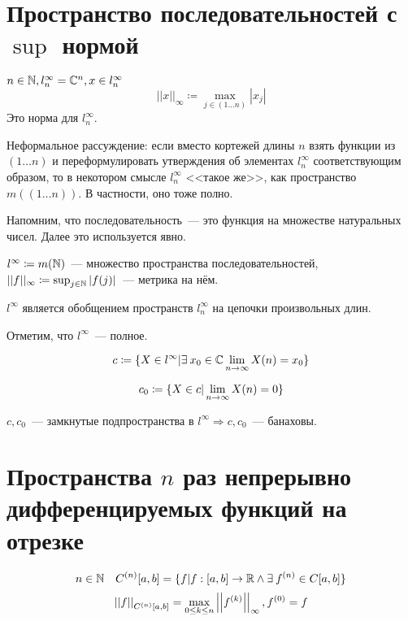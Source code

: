 \documentclass[document]{subfiles}
\begin{document}
\section{Пространство последовательностей с $\sup$ нормой}

\begin{definition}
    $n \in \mathbb{N}, l^\infty_n = \mathbb{C}^n, x \in l^\infty_n$
    \[ ||x||_\infty \coloneqq \max_{j \in (1\ldots n)} |x_j| \]
    Это норма для $l^\infty_n$.
\end{definition}

Неформальное рассуждение: если вместо кортежей длины $n$ взять функции из $(1\ldots n)$ и переформулировать утверждения об элементах $l^\infty_n$ соответствующим образом, то в некотором смысле $l^\infty_n$ <<такое же>>, как пространство $m((1\ldots n))$. В частности, оно тоже полно.

Напомним, что последовательность~--- это функция на множестве натуральных чисел. Далее это используется явно.

\begin{definition}[$l^\infty$]
    $l^\infty \coloneqq m(\mathbb{N})$~--- множество пространства последовательностей, $||f||_\infty \coloneqq \sup_{j \in \mathbb{N}} |f(j)|$~--- метрика на нём.
\end{definition}

$l^\infty$ является обобщением пространств $l^\infty_n$ на цепочки произвольных длин.

Отметим, что $l^\infty$~--- полное.

\begin{definition}
    \[ c \coloneqq \{ X \in l^\infty | \exists x_0 \in \bC  \liml_{n \to \infty}{X(n)} = x_0 \} \]
\end{definition}
\begin{definition}
    \[ c_0 \coloneqq \{X \in c | \lim\limits_{n \to \infty} X(n) = 0\} \]
\end{definition}

$c, c_0$~--- замкнутые подпространства в $l^\infty \Rightarrow c, c_0$~--- банаховы. 

\section{Пространства $n$ раз непрерывно дифференцируемых функций на отрезке}

 \begin{definition}
    \[n \in \bN \quad C^{(n)}[a,b] = \{ f | f: [a, b] \rightarrow \bR \land \exists f^{(n)} \in C[a,b] \} \]
    \[ \left|\left| {f} \right| \right|_{C^{(n)}[a,b]} = \max_{0 \leq k \leq n} \left|\left| {f^{(k)}} \right| \right|_\infty, f^{(0)} = f \]
 \end{definition}
\end{document}
